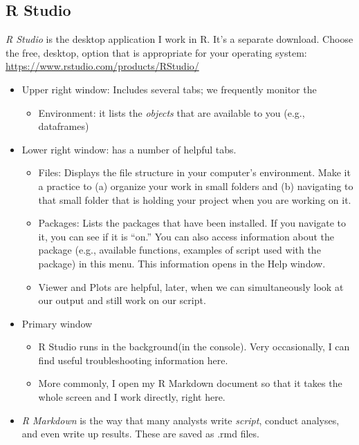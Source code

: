 \documentclass[
  english,
]{book}
\providecommand{\tightlist}{%
  \setlength{\itemsep}{0pt}\setlength{\parskip}{0pt}}
\begin{document}
\hypertarget{r-studio}{%
\subsection{R Studio}\label{r-studio}}

\emph{R Studio} is the desktop application I work in R. It's a separate download. Choose the free, desktop, option that is appropriate for your operating system: \url{https://www.rstudio.com/products/RStudio/}

\begin{itemize}
\tightlist
\item
  Upper right window: Includes several tabs; we frequently monitor the

  \begin{itemize}
  \tightlist
  \item
    Environment: it lists the \emph{objects} that are available to you (e.g., dataframes)
  \end{itemize}
\item
  Lower right window: has a number of helpful tabs.

  \begin{itemize}
  \tightlist
  \item
    Files: Displays the file structure in your computer's environment. Make it a practice to (a) organize your work in small folders and (b) navigating to that small folder that is holding your project when you are working on it.
  \item
    Packages: Lists the packages that have been installed. If you navigate to it, you can see if it is ``on.'' You can also access information about the package (e.g., available functions, examples of script used with the package) in this menu. This information opens in the Help window.
  \item
    Viewer and Plots are helpful, later, when we can simultaneously look at our output and still work on our script.
  \end{itemize}
\item
  Primary window

  \begin{itemize}
  \tightlist
  \item
    R Studio runs in the background(in the console). Very occasionally, I can find useful troubleshooting information here.
  \item
    More commonly, I open my R Markdown document so that it takes the whole screen and I work directly, right here.
  \end{itemize}
\item
  \emph{R Markdown} is the way that many analysts write \emph{script}, conduct analyses, and even write up results. These are saved as .rmd files.


\end{itemize}
\end{document}
